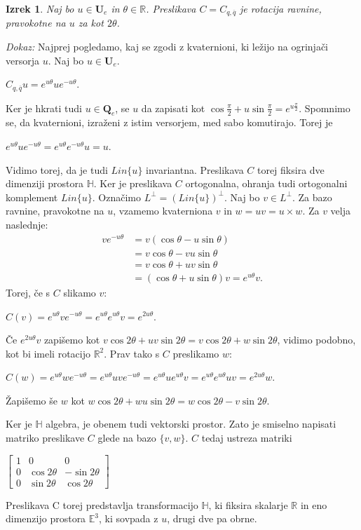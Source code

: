 \documentclass[a4paper,12pt]{article}
\def\R{\mathbb{R}} %
\def\H{\mathbb{H}} %
\def\Qe{\textbf{Q}_{e}} %
\def\Ue{\textbf{U}_{e}} %
\newcommand{\conj}[1]{\overline{#1}}
\newtheorem{izrek}{Izrek}
\begin{document}
\begin{izrek}
Naj bo $u \in \Ue$ in $\theta \in \R$. Preslikava $C = C_{q, \conj{q}}$ je rotacija ravnine, 
pravokotne na $u$ za kot $2\theta$.
\end{izrek}

\noindent
{\em Dokaz:\/} Najprej pogledamo, kaj se zgodi z kvaternioni, ki ležijo na ogrinjači versorja $u$.
Naj bo $u \in \Ue$.
\begin{center}
   $C_{q,\conj{q}}u = e^{u\theta} u e^{-u\theta}$.
\end{center}
Ker je hkrati tudi $u \in \Qe$, se $u$ da zapisati kot $\cos\frac{\pi}{2} + u\sin\frac{\pi}{2} = e^{u\frac{\pi}{2}}$.
Spomnimo se, da kvaternioni, izraženi z istim versorjem, med sabo komutirajo. Torej je
\begin{center}
   $e^{u\theta} u e^{-u\theta} = e^{u\theta}e^{-u\theta}u = u$.
\end{center}
Vidimo torej, da je tudi $Lin\{u\}$ invariantna. Preslikava $C$ torej fiksira dve dimenziji prostora $\H$.
Ker je preslikava $C$ ortogonalna, ohranja tudi ortogonalni komplement $Lin\{u\}$.
Označimo $L^{\bot} = (Lin\{u\})^{\bot}$. Naj bo $v \in L^{\bot}$. Za bazo ravnine, pravokotne na $u$, vzamemo kvaterniona $v$ in $w = uv = u \times w$.
Za $v$ velja naslednje:
\begin{align*}
   v e^{-u\theta} & = v(\cos\theta -u\sin\theta) \\
   & = v\cos\theta -vu \sin\theta \\
   & = v\cos\theta + uv\sin\theta \\
   & = (\cos\theta +u\sin\theta)v = e^{u\theta}v.
\end{align*}
Torej, če s $C$ slikamo $v$:
\begin{center}
   $C(v) = e^{u\theta}v e^{-u\theta} = e^{u\theta}e^{u\theta}v = e^{2u\theta}$.
\end{center}
Če $e^{2u\theta}v$ zapišemo kot $v\cos2\theta + uv\sin2\theta = v\cos2\theta + w\sin2\theta$, vidimo podobno, kot bi imeli rotacijo $\R^2$. Prav tako s $C$ preslikamo $w$:
\begin{center}
   $C(w) = e^{u\theta}w e^{-u\theta} = e^{u\theta}uve^{-u\theta} = e^{u\theta}ue^{u\theta}v = e^{u\theta}e^{u\theta}uv = e^{2u\theta}w$.
\end{center}
Žapišemo še $w$ kot $w\cos2\theta + wu\sin2\theta = w\cos2\theta - v\sin2\theta$.

Ker je $\H$ algebra, je obenem tudi vektorski prostor. Zato je smiselno napisati matriko preslikave $C$ glede na bazo $\{v, w\}$.
$C$ tedaj ustreza matriki
\begin{center}
   $
   \begin{bmatrix}
      1 & 0 & 0 \\
      0 & \cos2\theta & -\sin2\theta \\
      0 & \sin2\theta & \cos2\theta
   \end{bmatrix}
   $
\end{center}
Preslikava C torej predstavlja transformacijo $\H$, ki fiksira skalarje $\R$ in eno dimenzijo prostora $\mathbb{E}^3$, ki sovpada z $u$, drugi dve pa obrne.
\end{document}
